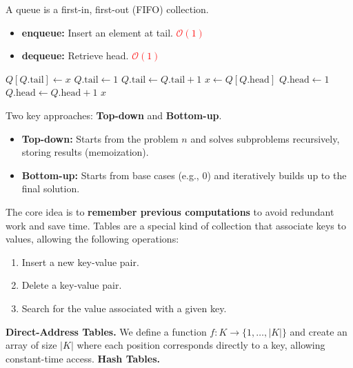\documentclass[a4paper,landscape]{article}
\newcommand{\timecomplexity}[1]{\textcolor{red}{#1}}
\newcommand{\bigo}{\mathcal{O}}
\begin{document}
\begin{multicols}{7}
\endtcolorbox
\tcolorbox[mybox={Queue}]
A queue is a first-in, first-out (FIFO) collection.
\begin{itemize}[noitemsep,itemsep=0pt]
    \item \textbf{enqueue:} Insert an element at tail. \timecomplexity{\(\bigo(1)\)}
    \item \textbf{dequeue:} Retrieve head. \timecomplexity{\(\bigo(1)\)}
\end{itemize}
\begin{algorithmic}[1]
        \State $Q[Q.\text{tail}] \gets x$
            \State $Q.\text{tail} \gets 1$
        \Else
            \State $Q.\text{tail} \gets Q.\text{tail} + 1$
        \EndIf
    \EndProcedure
    \State
        \State $x \gets Q[Q.\text{head}]$
            \State $Q.\text{head} \gets 1$
        \Else
            \State $Q.\text{head} \gets Q.\text{head} + 1$
        \EndIf
        \State \Return $x$
    \EndProcedure
\end{algorithmic}
\endtcolorbox
\tcolorbox[mybox={Dynamic Programming}]
Two key approaches: \textbf{Top-down} and \textbf{Bottom-up}.
\begin{itemize}[noitemsep, itemsep=0pt]
    \item \textbf{Top-down:} Starts from the problem $n$ and solves subproblems recursively, storing results (memoization).
    \item \textbf{Bottom-up:} Starts from base cases (e.g., 0) and iteratively builds up to the final solution.
\end{itemize}
The core idea is to \textbf{remember previous computations} to avoid redundant work and save time.
\endtcolorbox
\tcolorbox[mybox={Hash Functions and Tables}]
Tables are a special kind of collection that associate keys to values, allowing the following operations:
\begin{enumerate}[noitemsep, topsep=0pt]
    \item Insert a new key-value pair.
    \item Delete a key-value pair.
    \item Search for the value associated with a given key.
\end{enumerate}
\noindent\textbf{Direct-Address Tables.}  
We define a function $f : K \rightarrow \{1, \dots, |K|\}$ and create an array of size $|K|$ where each position corresponds directly to a key, allowing constant-time access.
\noindent\textbf{Hash Tables.}  

\end{multicols}
\end{document}
